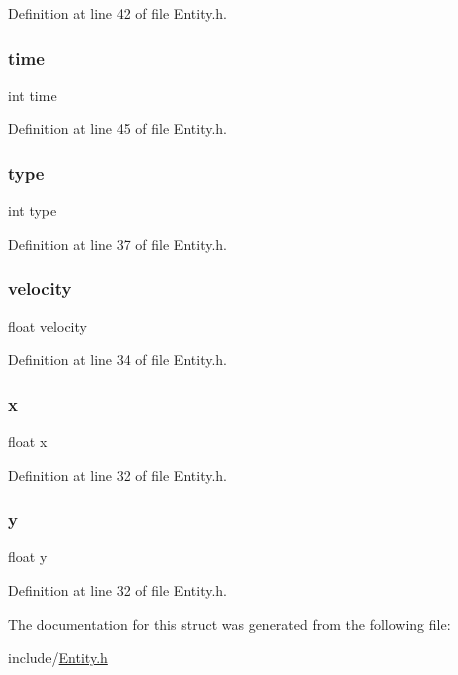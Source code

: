 Definition at line 42 of file Entity.\+h.

\mbox{\label{structentity_a42715f65f02da52edc5b22021d8ae670}} 
\subsubsection{\texorpdfstring{time}{time}}
{\footnotesize\ttfamily int time}



Definition at line 45 of file Entity.\+h.

\mbox{\label{structentity_ac765329451135abec74c45e1897abf26}} 
\subsubsection{\texorpdfstring{type}{type}}
{\footnotesize\ttfamily int type}



Definition at line 37 of file Entity.\+h.

\mbox{\label{structentity_ac46e821ae08930cc9e257642e34275a3}} 
\subsubsection{\texorpdfstring{velocity}{velocity}}
{\footnotesize\ttfamily float velocity}



Definition at line 34 of file Entity.\+h.

\mbox{\label{structentity_ad0da36b2558901e21e7a30f6c227a45e}} 
\subsubsection{\texorpdfstring{x}{x}}
{\footnotesize\ttfamily float x}



Definition at line 32 of file Entity.\+h.

\mbox{\label{structentity_aa4f0d3eebc3c443f9be81bf48561a217}} 
\subsubsection{\texorpdfstring{y}{y}}
{\footnotesize\ttfamily float y}



Definition at line 32 of file Entity.\+h.



The documentation for this struct was generated from the following file\+:\begin{DoxyCompactItemize}
\item 
include/\hyperlink{_entity_8h}{Entity.\+h}\end{DoxyCompactItemize}
